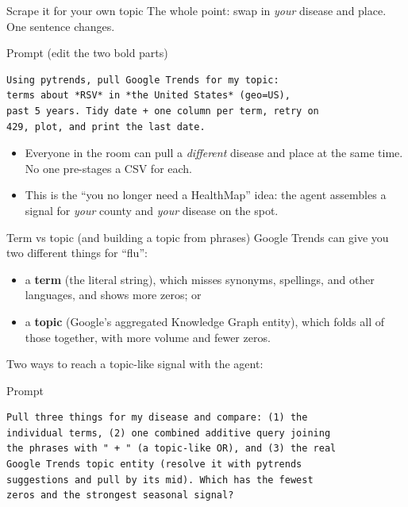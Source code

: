 \documentclass[aspectratio=169,11pt]{beamer}
\begin{document}
\begin{frame}[fragile]{Scrape it for your own topic}
  The whole point: swap in \emph{your} disease and place. One sentence changes.
  \begin{block}{Prompt (edit the two bold parts)}
  \begin{lstlisting}
Using pytrends, pull Google Trends for my topic:
terms about *RSV* in *the United States* (geo=US),
past 5 years. Tidy date + one column per term, retry on
429, plot, and print the last date.
  \end{lstlisting}
  \end{block}
  \begin{itemize}
    \item Everyone in the room can pull a \emph{different} disease and place at the same
          time. No one pre-stages a CSV for each.
    \item This is the ``you no longer need a HealthMap'' idea: the agent assembles a signal
          for \emph{your} county and \emph{your} disease on the spot.
  \end{itemize}
\end{frame}

\begin{frame}[fragile]{Term vs topic (and building a topic from phrases)}
  Google Trends can give you two different things for ``flu'':
  \begin{itemize}
    \item a \textbf{term} (the literal string), which misses synonyms, spellings, and other
          languages, and shows more zeros; or
    \item a \textbf{topic} (Google's aggregated Knowledge Graph entity), which folds all of
          those together, with more volume and fewer zeros.
  \end{itemize}
  Two ways to reach a topic-like signal with the agent:
  \begin{block}{Prompt}
  \begin{lstlisting}
Pull three things for my disease and compare: (1) the
individual terms, (2) one combined additive query joining
the phrases with " + " (a topic-like OR), and (3) the real
Google Trends topic entity (resolve it with pytrends
suggestions and pull by its mid). Which has the fewest
zeros and the strongest seasonal signal?
  \end{lstlisting}
  \end{block}
\end{frame}
\end{document}
